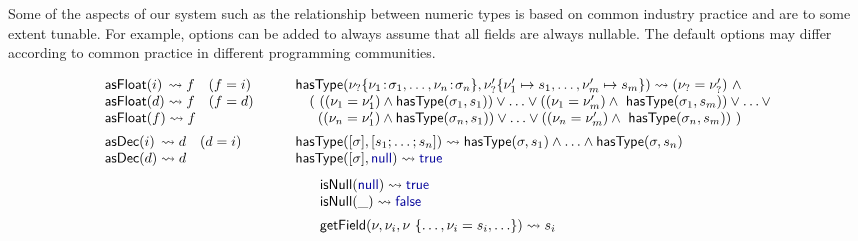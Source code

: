\documentclass[10pt,preprint,blind,clearpagebib]{sigplanconf}
\newcommand{\kvd}[1]{\textnormal{\textcolor{kvdclr}{\sffamily #1}}}
\newcommand{\ident}[1]{\textnormal{\sffamily #1}}
\newcommand{\reduce}{\rightsquigarrow}
\begin{document}
Some of the aspects of our system such as the relationship between numeric types is
based on common industry practice and are to some extent tunable. For example, 
options can be added to always assume that all fields are always nullable.  The default
options may differ according to common practice in different programming communities.


\begin{figure}
\noindent
\begin{equation*}
\begin{array}{l}
\ident{asFloat}(i) \,\reduce f\quad(f = i)\\
\ident{asFloat}(d) \reduce f\quad(f = d)\\
\ident{asFloat}(f) \reduce f
\\[0.5em]
\ident{asDec}(i) \,\reduce d\quad(d = i)\\
\ident{asDec}(d) \reduce d
\end{array}
\qquad
\begin{array}{l}
\ident{hasType}(\nu_? \{ \nu_1 \!:\! \sigma_1, \ldots, \nu_n \!:\! \sigma_n \}, \nu'_? \{ \nu'_1\mapsto s_1, \ldots, \nu'_m\mapsto s_m \}) \reduce (\nu_? = \nu'_?) ~\wedge \\
  \quad (~ ((\nu_1 = \nu'_1) \wedge \ident{hasType}(\sigma_1, s_1)) \vee\ldots\vee ((\nu_1 = \nu'_m) \wedge \ident{hasType}(\sigma_1, s_m)) \vee \ldots \vee\\
  \quad ~\; ((\nu_n = \nu'_1) \wedge \ident{hasType}(\sigma_n, s_1)) \vee\ldots\vee ((\nu_n = \nu'_m) \wedge \ident{hasType}(\sigma_n, s_m))~)
\\[0.5em]
\ident{hasType}([\sigma], [s_1; \ldots; s_n]) \reduce \ident{hasType}(\sigma, s_1)\wedge\ldots\wedge\ident{hasType}(\sigma, s_n) \\
\ident{hasType}([\sigma], \kvd{null}) \reduce \kvd{true} \\  
\end{array}  
\end{equation*}
%
\vspace{-0.5em}
%
\begin{equation*}
\begin{array}{l}
\ident{isNull}(\kvd{null}) \reduce \kvd{true} \\
\ident{isNull}(\_) \reduce \kvd{false} 
\\[0.5em]
\ident{getField}(\nu,\nu_i, \nu~\{\ldots, \nu_i=s_i, \ldots\}) \reduce s_i\\

\end{array}
\end{equation*}
\end{figure}
\end{document}
